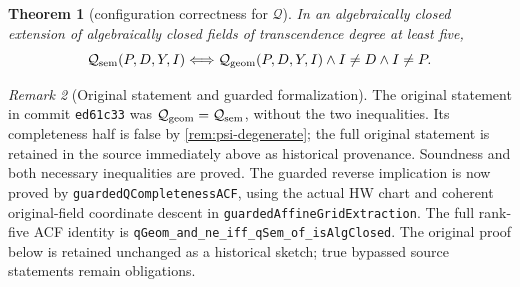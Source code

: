 \documentclass[11pt,oneside]{article}
\newtheorem{theorem}{Theorem}[section]
\theoremstyle{definition}
\theoremstyle{remark}
\newtheorem{remark}[theorem]{Remark}
\newcommand{\Qrel}{\mathcal{Q}}
\newcommand{\lean}[1]{\nolinkurl{#1}}
\begin{document}

\begin{theorem}[configuration correctness for $\Qrel$]\label{thm:q-correct}
In an algebraically closed extension of algebraically closed fields of transcendence degree
at least five,
\[
  \Qrel_{\rm sem}(P,D,Y,I)\Longleftrightarrow
  \Qrel_{\rm geom}(P,D,Y,I)\land I\ne D\land I\ne P.
\]
\end{theorem}
\begin{remark}[Original statement and guarded formalization]
The original statement in commit \texttt{ed61c33} was
$\Qrel_{\rm geom}=\Qrel_{\rm sem}$, without the two inequalities.  Its completeness
half is false by \cref{rem:psi-degenerate}; the full original statement is retained
in the source immediately above as historical provenance.  Soundness and both
necessary inequalities are proved.  The guarded reverse implication is now proved by
\lean{guardedQCompletenessACF}, using the actual HW chart and coherent original-field
coordinate descent in \lean{guardedAffineGridExtraction}.  The full rank-five ACF
identity is \lean{qGeom_and_ne_iff_qSem_of_isAlgClosed}.  The original proof below is
retained unchanged as a historical sketch; true bypassed source statements remain
obligations.
\end{remark}
\end{document}
